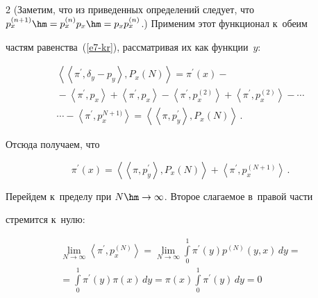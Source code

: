 \begin{multicols}{2}
(Заметим, что из приведенных определений следует, что $p_x^{(n+1)}\hm= 


p_x^{(n)} p_x\hm= p_x p_x^{(n)}$.) Применим этот функционал к~обеим 


час\-тям равенства~(\ref{e7-kr}), рас\-смат\-ри\-вая их как функции~$y$:


\begin{multline*}


\left\langle \left\langle \pi^\prime, \delta_y-p_y\right\rangle, 


P_x(N)\right\rangle=\pi^\prime(x) -{}\\


{}-\left\langle \pi^\prime, p_x\right\rangle +\left\langle \pi^\prime, 


p_x\right\rangle-\left\langle \pi^\prime, p_x^{(2)}\right\rangle+ \left\langle 


\pi^\prime, p_x^{(2)}\right\rangle -\cdots{}\\


{}\cdots - \left\langle \pi^\prime, 


p_x^{N+1)}\right\rangle= \left\langle\left\langle \pi, p_y^\prime\right\rangle, P_x(N)\right\rangle\,.


\end{multline*}


    Отсюда получаем, что


  $$


  \pi^\prime(x)=\left\langle\left\langle \pi, p_y^\prime\right\rangle, 


P_x(N)\right\rangle +\left\langle \pi^\prime, p_x^{(N+1)}\right\rangle\,.


  $$


  


  Перейдем к~пределу при $N\hm\to \infty$. Второе сла\-га\-емое в~правой час\-ти 


стремится к~нулю:


  \begin{multline*}


  \lim\limits_{N\to\infty} \left\langle \pi^\prime, p_x^{(N)}\right\rangle = 


\lim\limits_{N\to\infty} \int\limits_0^1 \pi^\prime(y) p^{(N)}(y,x)\,dy={}\\


{}=


  \int\limits_0^1 \pi^\prime(y) \pi(x)\,dy=\pi(x) \int\limits_0^1 \pi^\prime(y)\,dy=0


  \end{multline*}



\end{multicols}
